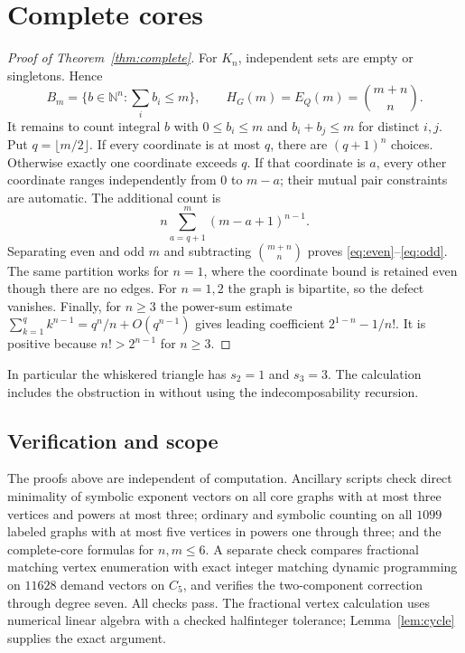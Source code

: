 \documentclass[11pt]{article}
\theoremstyle{remark}
\newcommand{\NN}{\mathbb N}
\begin{document}
\section{Complete cores}

\begin{proof}[Proof of Theorem~\ref{thm:complete}]
For $K_n$, independent sets are empty or singletons. Hence
\[
B_m=\{b\in\NN^n:\textstyle\sum_i b_i\leq m\},\qquad
H_G(m)=E_Q(m)=\binom{m+n}{n}.
\]
It remains to count integral $b$ with $0\leq b_i\leq m$ and
$b_i+b_j\leq m$ for distinct $i,j$. Put $q=\lfloor m/2\rfloor$.
If every coordinate is at most $q$, there are $(q+1)^n$ choices.
Otherwise exactly one coordinate exceeds $q$. If that coordinate is
$a$, every other coordinate ranges independently from $0$ to $m-a$;
their mutual pair constraints are automatic. The additional count is
\[
n\sum_{a=q+1}^m(m-a+1)^{n-1}.
\]
Separating even and odd $m$ and subtracting $\binom{m+n}{n}$ proves
\eqref{eq:even}--\eqref{eq:odd}. The same partition works for $n=1$,
where the coordinate bound is retained even though there are no edges.
For $n=1,2$ the graph is bipartite, so the defect vanishes.
Finally, for $n\geq3$ the power-sum estimate
$\sum_{k=1}^q k^{n-1}=q^n/n+O(q^{n-1})$ gives leading coefficient
$2^{1-n}-1/n!$. It is positive because $n!>2^{n-1}$ for $n\geq3$.
\end{proof}

In particular the whiskered triangle has $s_2=1$ and $s_3=3$. The
calculation includes the obstruction in \cite[Remark~5.3]{DG} without
using the indecomposability recursion.

\subsection*{Verification and scope}
The proofs above are independent of computation. Ancillary scripts
check direct minimality of symbolic exponent vectors on all core graphs
with at most three vertices and powers at most three; ordinary and
symbolic counting on all $1099$ labeled graphs with at most five
vertices in powers one through three; and the complete-core formulas
for $n,m\leq6$. A separate check compares fractional matching vertex
enumeration with exact integer matching dynamic programming on $11628$
demand vectors on $C_5$, and verifies the two-component correction
through degree seven. All checks pass. The fractional vertex calculation
uses numerical linear algebra with a checked halfinteger tolerance;
Lemma~\ref{lem:cycle} supplies the exact argument.
\end{document}
